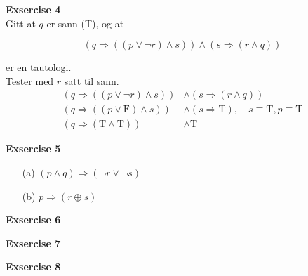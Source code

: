 \documentclass[a4paper, 12pt]{article}  %
\begin{document}
\textbf{Exsercise 4} 
\\\newline Gitt at $q$ er sann (T), og at 

$$ (q \Rightarrow ((p \lor \neg r) \land s)) \land (s \Rightarrow (r \land q)) $$

er en tautologi.
\\Tester med $r$ satt til sann.
\begin{align*}
    (q \Rightarrow ((p \lor \neg r) \land s)) & \land (s \Rightarrow (r \land q)) \\
    (q \Rightarrow ((p \lor \mathrm{F}) \land s)) & \land (s \Rightarrow \mathrm{T}), \quad s \equiv \mathrm{T}, p \equiv \mathrm{T}\\
    (q \Rightarrow (\mathrm{T} \land \mathrm{T})) & \land \mathrm{T}
\end{align*}
\begin{center}
\end{center}

\newpage
\textbf{Exsercise 5}
\begin{enumerate}
    \item [(a)] $(p \land q) \Rightarrow (\neg r \lor \neg s)$
    \item [(b)] $p \Rightarrow (r \oplus s)$
\end{enumerate}

\textbf{Exsercise 6}

\textbf{Exsercise 7}

\textbf{Exsercise 8}
\end{document}
